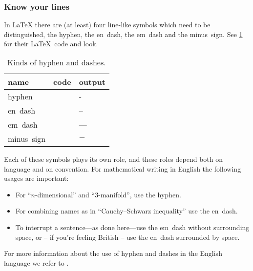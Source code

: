 \subsubsection{Know your lines}

In {\LaTeX} there are (at least) four line-like symbols which need to be distinguished, the hyphen, the en~dash, the em~dash and the minus~sign.
See \cref{dash list} for their {\LaTeX}~code and look.
\begin{table}[tb]
  \begin{center}
  \begin{tabular}{@{}lll@{}}
    \toprule
    \textbf{name}
    &
    \textbf{code}
    &
    \textbf{output}
    \\
    \midrule
    hyphen
    &
    \inlinecode{-}
    &
    -
    \\
    en~dash
    &
    \inlinecode{--}
    &
    --
    \\
    em~dash
    &
    \inlinecode{---}
    &
    ---
    \\
    minus~sign
    &
    \inlinecode{\$-\$}
    &
    $-$
    \\
    \bottomrule
  \end{tabular}
  \end{center}
  \caption{Kinds of hyphen and dashes.}
  \label{dash list}
\end{table}
Each of these symbols plays its own role, and these roles depend both on language and on convention.
For mathematical writing in English the following usages are important:
\begin{itemize}
  \item
    For \enquote{$n$-dimensional} and \enquote{$3$-manifold}, use the hyphen.
  \item
    For combining names as in \enquote{Cauchy--Schwarz inequality} use the en~dash.
  \item
    To interrupt a sentence---as done here---use the em~dash without surrounding space, or -- if you’re feeling British -- use the en~dash surrounded by space.
\end{itemize}
For more information about the use of hyphen and dashes in the English language we refer to \cite[6.75--6.94]{chicago}.

